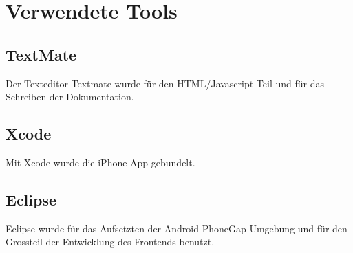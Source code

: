 
\newpage
\section{Verwendete Tools} %
\label{sec:Verwendete Tools}

\subsection{TextMate} %
\label{sub:TextMate}
Der Texteditor Textmate wurde für den HTML/Javascript Teil und für das Schreiben der Dokumentation.

\subsection{Xcode} %
\label{ssub:Xcode}
Mit Xcode wurde die iPhone App gebundelt.

\subsection{Eclipse} %
\label{sub:eclispe}
Eclipse wurde für das Aufsetzten der Android PhoneGap Umgebung und für den Grossteil der Entwicklung des Frontends benutzt.
